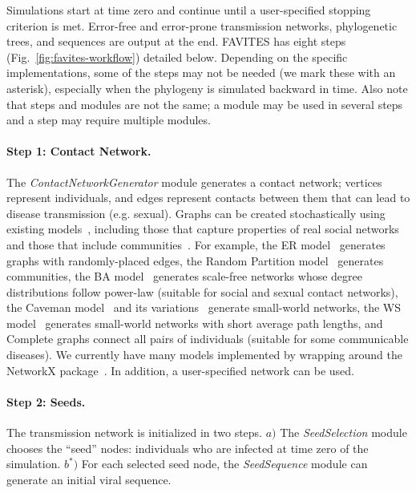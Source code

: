 Simulations start at time zero and continue until a user-specified stopping criterion is met. Error-free and error-prone transmission networks, phylogenetic trees, and sequences are output at the end. FAVITES has eight steps (Fig.~\ref{fig:favites-workflow}) detailed below. Depending on the specific implementations, some of the steps may not be needed (we mark these with an asterisk), especially when the phylogeny is simulated backward in time. Also note that steps and modules are not the same; a module may be used in several steps and a step may require multiple modules.

\paragraph{Step 1: Contact Network.} The \textit{ContactNetworkGenerator} module generates a contact network; vertices represent individuals, and edges represent contacts between them that can lead to disease transmission (e.g. sexual). Graphs can be created stochastically using existing models~\cite{Karonski1982}, including those that capture properties of real social networks~\cite{Watts1998,Barabasi1999,Newman2002} and those that include communities~\cite{Watts1999,Fortunato2010}. For example, the \gls{ER} model~\cite{Erdos1960} generates graphs with randomly-placed edges, the Random Partition model~\cite{Fortunato2010} generates communities, the \gls{BA} model~\cite{Barabasi1999} generates scale-free networks whose degree distributions follow power-law (suitable for social and sexual contact networks), the Caveman model~\cite{Watts1999} and its variations~\cite{Fortunato2010} generate small-world networks, the \gls{WS} model~\cite{Watts1998} generates small-world networks with short average path lengths, and Complete graphs connect all pairs of individuals (suitable for some communicable diseases). We currently have many models implemented by wrapping around the NetworkX package~\cite{Hagberg2008}. In addition, a user-specified network can be used.

\paragraph{Step 2: Seeds.} The transmission network is initialized in two steps. $a)$ The \textit{SeedSelection} module chooses the ``seed'' nodes: individuals who are infected at time zero of the simulation. $b^*)$ For each selected seed node, the \textit{SeedSequence} module can generate an initial viral sequence.

